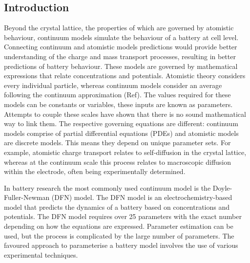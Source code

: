 \documentclass[aps,prb,twocolumn,superscriptaddress,reprint]{revtex4-1}
\begin{document}
\subsection{Introduction}
Beyond the crystal lattice, the properties of which are governed by atomistic behaviour, continuum models simulate the behaviour of a battery at cell level. Connecting continuum and atomistic models predictions would provide better understanding of the charge and mass transport processes, resulting in better predictions of battery behaviour. These models are governed by mathematical expressions that relate concentrations and potentials. Atomistic theory considers every individual particle, whereas continuum models consider an average following the continuum approximation (Ref).  The values required for these models can be constants or variables, these inputs are known as parameters. Attempts to couple these scales have shown that there is no sound mathematical way to link them.\cite{Fackeldey2015} The respective governing equations are different: continuum models comprise of partial differential equations (PDEs) and atomistic models are discrete models.\cite{Badia2007} This means they depend on unique parameter sets. For example, atomistic charge transport relates to self-diffusion in the crystal lattice, whereas at the continuum scale this process relates to macroscopic diffusion within the electrode, often being experimentally determined.

In battery research the most commonly used continuum model is the Doyle-Fuller-Newman (DFN) model.\cite{Newman1975porous, Doyle1993DFN} The DFN model is an electrochemistry-based model that predicts the dynamics of a battery based on concentrations and potentials. The DFN model requires over 25 parameters with the exact number depending on how the equations are expressed.\cite{Kim2011} Parameter estimation can be used, but the process is complicated by the large number of parameters.\cite{Jin2018} The favoured approach to parameterise a battery model involves the use of various experimental techniques.
\end{document}
